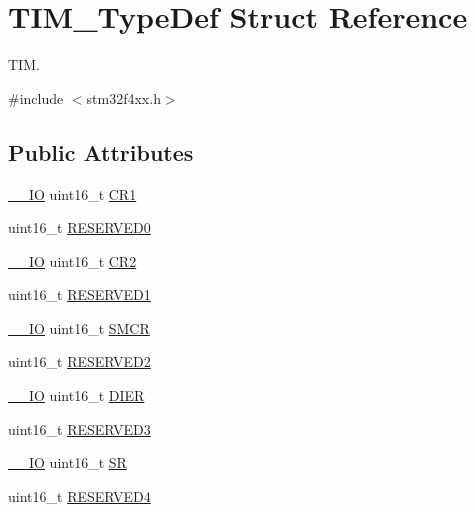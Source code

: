 \hypertarget{struct_t_i_m___type_def}{}\section{T\+I\+M\+\_\+\+Type\+Def Struct Reference}
\label{struct_t_i_m___type_def}


T\+IM.  




{\ttfamily \#include $<$stm32f4xx.\+h$>$}

\subsection*{Public Attributes}
\begin{DoxyCompactItemize}
\item 
\hyperlink{core__cm4_8h_aec43007d9998a0a0e01faede4133d6be}{\+\_\+\+\_\+\+IO} uint16\+\_\+t \hyperlink{struct_t_i_m___type_def_a410988826004fdd21d55071215144ba9}{C\+R1}
\item 
uint16\+\_\+t \hyperlink{struct_t_i_m___type_def_a88caad1e82960cc6df99d935ece26c1b}{R\+E\+S\+E\+R\+V\+E\+D0}
\item 
\hyperlink{core__cm4_8h_aec43007d9998a0a0e01faede4133d6be}{\+\_\+\+\_\+\+IO} uint16\+\_\+t \hyperlink{struct_t_i_m___type_def_a954eb69fd4e2e6b43ba6c80986f691d8}{C\+R2}
\item 
uint16\+\_\+t \hyperlink{struct_t_i_m___type_def_a59c46ac3a56c6966a7f8f379a2fd1e3e}{R\+E\+S\+E\+R\+V\+E\+D1}
\item 
\hyperlink{core__cm4_8h_aec43007d9998a0a0e01faede4133d6be}{\+\_\+\+\_\+\+IO} uint16\+\_\+t \hyperlink{struct_t_i_m___type_def_a476012f1b4567ffc21ded0b5fd50985e}{S\+M\+CR}
\item 
uint16\+\_\+t \hyperlink{struct_t_i_m___type_def_af62f86f55f2a387518f3de10d916eb7c}{R\+E\+S\+E\+R\+V\+E\+D2}
\item 
\hyperlink{core__cm4_8h_aec43007d9998a0a0e01faede4133d6be}{\+\_\+\+\_\+\+IO} uint16\+\_\+t \hyperlink{struct_t_i_m___type_def_a25b145e57a694bb384eee08fcd107c3a}{D\+I\+ER}
\item 
uint16\+\_\+t \hyperlink{struct_t_i_m___type_def_a8f952613a22049f3ea2b50b7e0d10472}{R\+E\+S\+E\+R\+V\+E\+D3}
\item 
\hyperlink{core__cm4_8h_aec43007d9998a0a0e01faede4133d6be}{\+\_\+\+\_\+\+IO} uint16\+\_\+t \hyperlink{struct_t_i_m___type_def_af686e22c1792dc59dfeffe451d47cf13}{SR}
\item 
uint16\+\_\+t \hyperlink{struct_t_i_m___type_def_a36afe894c9b0878347d0c038c80e4c22}{R\+E\+S\+E\+R\+V\+E\+D4}

\end{DoxyCompactItemize}

